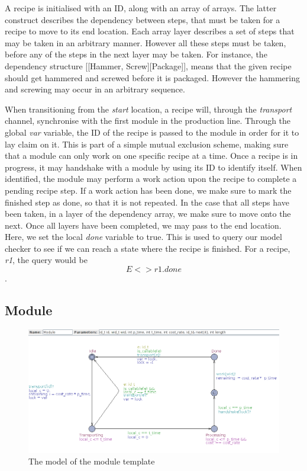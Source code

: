 A recipe is initialised with an ID, along with an array of arrays. The latter construct describes the dependency between steps, that must be taken for a recipe to move to its end location. Each array layer describes a set of steps that may be taken in an arbitrary manner. However all these steps must be taken, before any of the steps in the next layer may be taken. For instance, the dependency structure [[Hammer, Screw][Package]], means that the given recipe should get hammered and screwed before it is packaged. However the hammering and screwing may occur in an arbitrary sequence.


When transitioning from the \emph{start} location, a recipe will, through the \emph{transport} channel, synchronise with the first module in the production line. Through the global \emph{var} variable, the ID of the recipe is passed to the module in order for it to lay claim on it. This is part of a simple mutual exclusion scheme, making sure that a module can only work on one specific recipe at a time. Once a recipe is in progress, it may handshake with a module by using its ID to identify itself. When identified, the module may perform a work action upon the recipe to complete a pending recipe step. If a work action has been done, we make sure to mark the finished step as done, so that it is not repeated. In the case that all steps have been taken, in a layer of the dependency array, we make sure to move onto the next. Once all layers have been completed, we may pass to the end location. Here, we set the local \emph{done} variable to true. This is used to query our model checker to see if we can reach a state where the recipe is finished. For a recipe, \emph{r1}, the query would be \[E<> r1.done\].

\subsection{Module}
\label{subs:module}

\begin{figure}[h]
\centering
\includegraphics[width=\textwidth]{images/firstmodule.png}
\caption{The model of the module template}
\label{fig:firstmodule}
\end{figure}


